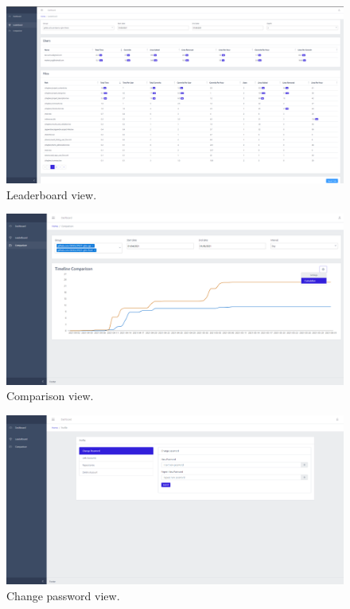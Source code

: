 \begin{figure}[ht]
    \centering
    \includegraphics[width=1\textwidth]{figures/views/leaderboard}
    \caption{Leaderboard view.}
    \label{fig:leaderboard}
\end{figure}

\begin{figure}[ht]
    \centering
    \includegraphics[width=1\textwidth]{figures/views/comparison}
    \caption{Comparison view.}
    \label{fig:comparison}
\end{figure}

\begin{figure}[ht]
    \centering
    \includegraphics[width=1\textwidth]{figures/views/change_password}
    \caption{Change password view.}
    \label{fig:change_password}
\end{figure}


